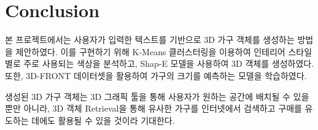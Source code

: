\documentclass[11pt]{article}
\begin{document}
\section{Conclusion}
본 프로젝트에서는 사용자가 입력한 텍스트를 기반으로 3D 가구 객체를 생성하는 방법을 제안하였다.
이를 구현하기 위해 K-Means 클러스터링을 이용하여 인테리어 스타일 별로 주로 사용되는 색상을 분석하고, Shap-E 모델을 사용하여 3D 객체를 생성하였다.
또한, 3D-FRONT 데이터셋을 활용하여 가구의 크기를 예측하는 모델을 학습하였다.

생성된 3D 가구 객체는 3D 그래픽 툴을 통해 사용자가 원하는 공간에 배치될 수 있을뿐만 아니라, 3D 객체 Retrieval을 통해 유사한 가구를 인터넷에서 검색하고 구매를 유도하는 데에도 활용될 수 있을 것이라 기대한다.



\end{document}
